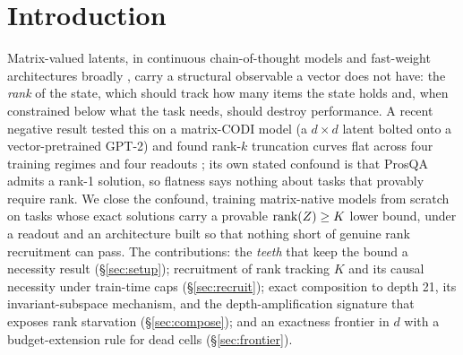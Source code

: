 \section{Introduction}
\label{sec:intro}

Matrix-valued latents, in continuous chain-of-thought models
\citep{hao2024coconut} and fast-weight architectures broadly
\citep{schlag2021linear}, carry a structural observable a vector does
not have: the \emph{rank} of the state, which should track how many
items the state holds and, when constrained below what the task needs,
should destroy performance.
A recent negative result tested this on a matrix-CODI model (a
$d \times d$ latent bolted onto a vector-pretrained GPT-2) and found
rank-$k$ truncation curves flat across four training regimes and four
readouts \citep{larson2026gradient}; its own stated confound is that
ProsQA admits a rank-1 solution, so flatness says nothing about tasks
that provably require rank. We close the confound,
training matrix-native models from scratch on tasks whose exact
solutions carry a provable $\operatorname{rank}(Z) \geq K$ lower bound, under a
readout and an architecture built so that nothing short of genuine rank
recruitment can pass. The contributions: the \emph{teeth} that keep the
bound a necessity result (\S\ref{sec:setup}); recruitment of rank
tracking $K$ and its causal necessity under train-time caps
(\S\ref{sec:recruit}); exact composition to depth 21, its
invariant-subspace mechanism, and the depth-amplification signature
that exposes rank starvation (\S\ref{sec:compose}); and an exactness
frontier in $d$ with a budget-extension rule for dead cells
(\S\ref{sec:frontier}).
